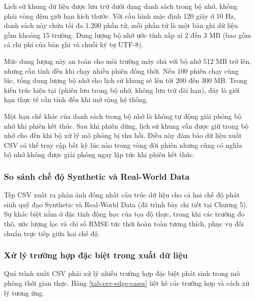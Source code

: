 \hspace{0.5cm} Lịch sử khung dữ liệu được lưu trữ dưới dạng danh sách trong bộ nhớ, không phải vòng đệm giới hạn kích thước. Với cấu hình mặc định 120 giây ở 10 Hz, danh sách này chứa tối đa 1.200 phần tử, mỗi phần tử là một bản ghi dữ liệu gồm khoảng 15 trường. Dung lượng bộ nhớ ước tính xấp xỉ 2 đến 3 MB (bao gồm cả chi phí của bản ghi và chuỗi ký tự UTF-8).

Mức dung lượng này an toàn cho môi trường máy chủ với bộ nhớ 512 MB trở lên, nhưng cần tính đến khi chạy nhiều phiên đồng thời. Nếu 100 phiên chạy cùng lúc, tổng dung lượng bộ nhớ cho lịch sử khung sẽ lên tới 200 đến 300 MB. Trong kiến trúc hiện tại (phiên lưu trong bộ nhớ, không lưu trữ dài hạn), đây là giới hạn thực tế cần tính đến khi mở rộng hệ thống.

Một hạn chế khác của danh sách trong bộ nhớ là không tự động giải phóng bộ nhớ khi phiên kết thúc. Sau khi phiên dừng, lịch sử khung vẫn được giữ trong bộ nhớ cho đến khi bộ xử lý mô phỏng bị thu hồi. Điều này đảm bảo dữ liệu xuất CSV có thể truy cập bất kỳ lúc nào trong vòng đời phiên nhưng cũng có nghĩa bộ nhớ không được giải phóng ngay lập tức khi phiên kết thúc.

\subsubsection{So sánh chế độ Synthetic và Real-World Data}

\hspace{0.5cm} Tệp CSV xuất ra phản ánh đồng nhất cấu trúc dữ liệu cho cả hai chế độ phát sinh quỹ đạo Synthetic và Real-World Data (đã trình bày chi tiết tại Chương 5). Sự khác biệt nằm ở đặc tính động học của tọa độ thực, trong khi các trường đo thô, ước lượng lọc và chỉ số RMSE tức thời hoàn toàn tương thích, phục vụ đối chuẩn trực tiếp giữa hai chế độ.

\subsubsection{Xử lý trường hợp đặc biệt trong xuất dữ liệu}

\hspace{0.5cm} Quá trình xuất CSV phải xử lý nhiều trường hợp đặc biệt phát sinh trong mô phỏng thời gian thực. Bảng \ref{tab:csv-edge-cases} liệt kê các trường hợp và cách xử lý tương ứng.

